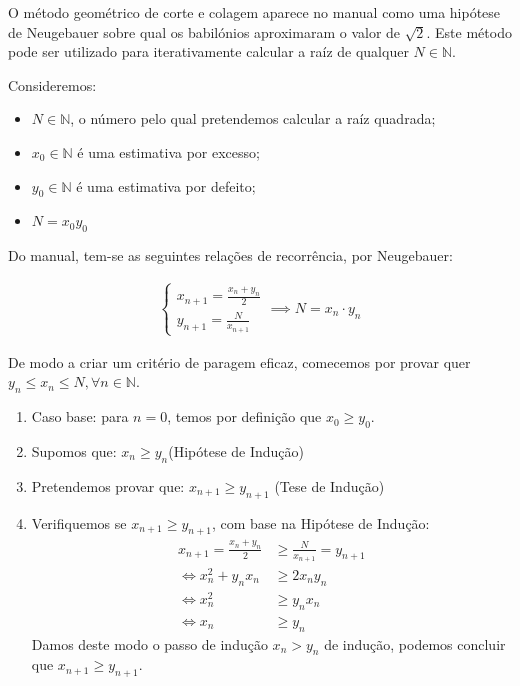 \exercicio{}

O método geométrico de corte e colagem aparece no manual\parencite[pág. 77-78]{Estrada2000} como uma
hipótese de Neugebauer sobre qual os babilónios aproximaram o valor de $\sqrt{2}$.
Este método pode ser utilizado para iterativamente calcular a raíz de qualquer $N \in \mathbb{N}$.

\vspace{0.25cm}

\noindent
Consideremos:
\begin{itemize}
	\item $N\in \mathbb{N}$, o número pelo qual pretendemos calcular a raíz quadrada;
	\item $x_0 \in \mathbb{N}$ é uma estimativa por excesso;
	\item $y_0 \in \mathbb{N}$ é uma estimativa por defeito;
	\item $N = x_0 y_0$
\end{itemize}

\noindent
Do manual\parencite[pág. 77]{Estrada2000}, tem-se as seguintes relações de recorrência, por
Neugebauer:

\begin{align*}
	\begin{cases}
		x_{n + 1} = \frac{x_n + y_n}{2}\\
		y_{n + 1} = \frac{N}{x_{n+1}}
	\end{cases}
	\implies N = x_n \cdot y_n
\end{align*}

\noindent
De modo a criar um critério de paragem eficaz, comecemos por provar quer $y_n \leq x_n \leq N,
\forall n \in \mathbb{N}$.

\begin{enumerate}
	\item Caso base: para $n = 0$, temos por definição que $x_0 \geq y_0$.
	\item Supomos que: $x_n \geq y_n$(Hipótese de Indução)
	\item Pretendemos provar que: $x_{n+1} \geq y_{n+1}$ (Tese de Indução)
	\item Verifiquemos se $x_{n + 1} \geq y_{n + 1}$, com base na Hipótese de Indução:
		\begin{align*}
			x_{n + 1} = \frac{x_n + y_n}{2} &\geq \frac{N}{x_{n + 1}} = y_{n +1} \\ 
			\iff x_n^2 + y_nx_n &\geq 2x_ny_n\\
			\iff x_n^2 &\geq y_nx_n\\
			\iff x_n &\geq y_n
		\end{align*}
		Damos deste modo o passo de indução $x_n > y_n$ de indução, podemos concluir que $x_{n +1}
		\geq y_{n + 1}$.
\end{enumerate}

